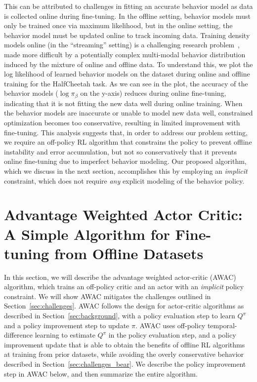 \documentclass[conference]{IEEEtran}
\begin{document}
This can be attributed to challenges in fitting an accurate behavior model as data is collected online during fine-tuning. In the offline setting, behavior models must only be trained once via maximum likelihood, but in the online setting, the behavior model must be updated online to track incoming data. Training density models online (in the ``streaming'' setting) is a challenging research problem~\citep{ramapuram2017lifelonggm}, made more difficult by a potentially complex multi-modal behavior distribution induced by the mixture of online and offline data. To understand this, we plot the log likelihood of learned behavior models on the dataset during online and offline training for the HalfCheetah task. As we can see in the plot, the accuracy of the behavior models ($\log \pi_\beta$ on the y-axis) reduces during online fine-tuning, indicating that it is not fitting the new data well during online training. When the behavior models are inaccurate or unable to model new data well, constrained optimization becomes too conservative, resulting in limited improvement with fine-tuning. This analysis suggests that, in order to address our problem setting, we require an off-policy RL algorithm that constrains the policy to prevent offline instability and error accumulation, but not so conservatively that it prevents online fine-tuning due to imperfect behavior modeling. Our proposed algorithm, which we discuss in the next section, accomplishes this by employing an \emph{implicit} constraint, which does not require \emph{any} explicit modeling of the behavior policy.

\section{Advantage Weighted Actor Critic: A Simple Algorithm for Fine-tuning from Offline Datasets}
\label{sec:method}

In this section, we will describe the advantage weighted actor-critic (AWAC) algorithm, which trains an off-policy critic and an actor with an \emph{implicit} policy constraint. We will show AWAC mitigates the challenges outlined in Section~\ref{sec:challenges}. AWAC follows the design for actor-critic algorithms as described in Section~\ref{sec:background}, with a policy evaluation step to learn $Q^\pi$ and a policy improvement step to update $\pi$. AWAC uses off-policy temporal-difference learning to estimate $Q^\pi$ in the policy evaluation step, and a policy improvement update that is able to obtain the benefits of offline RL algorithms at training from prior datasets, while avoiding the overly conservative behavior described in Section~\ref{sec:challenges_bear}. We describe the policy improvement step in AWAC below, and then summarize the entire algorithm. 
\end{document}
